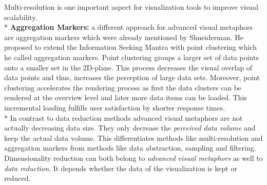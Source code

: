 Multi-resolution is one important aspect for visualization tools to improve visual scalability.\\*
\textbf{Aggregation Markers:} a different approach for advanced visual metaphors are aggregation markers which were already mentioned by Shneiderman\cite{Shneiderman2008}. He proposed to extend the Information Seeking Mantra\cite{Shneiderman1996} with point clustering which he called aggregation markers. Point clustering groups a larger set of data points onto a smaller set in the 2D-plane\cite{Morrison2014}. This process decreases the visual overlap of data points and thus, increases the perception of large data sets. Moreover, point clustering accelerates the rendering process as first the data clusters  can be rendered at the overview level and later more data items can be loaded. This incremental loading fulfills user satisfaction by shorter response times.\\*
In contrast to data reduction methods advanced visual metaphors are not actually decreasing data size. They only decrease the \textit{perceived data volume} and keep the actual data volume. This differentiates methods like multi-resolution and aggregation markers from methods like data abstraction, sampling and filtering. Dimensionality reduction can both belong to \textit{advanced visual metaphors} as well to \textit{data reduction}. It depends whether the data of the visualization is kept or reduced. 

